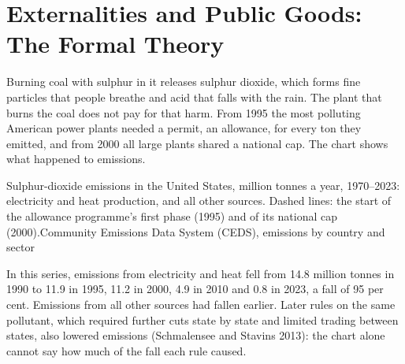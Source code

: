 \chapter{Externalities and Public Goods: The Formal Theory}\label{ch:b2:externalities-and-public-goods-theory}

Burning coal with sulphur in it releases sulphur dioxide, which forms fine particles that people breathe and acid that
falls with the rain. The plant that burns the coal does not pay for that harm. From 1995 the most polluting American power plants needed a
permit, an allowance, for every ton they emitted, and from 2000 all large plants shared a national cap. The chart
shows what happened to emissions.

\begin{openingchart}{Sulphur-dioxide emissions in the United States, million tonnes a year, 1970--2023: electricity and heat
  production, and all other sources. Dashed lines: the start of the allowance programme's first phase (1995) and of
  its national cap (2000).}{Community Emissions Data System (CEDS), emissions by country and sector}
\end{openingchart}

In this series, emissions from electricity and heat fell from 14.8 million tonnes in 1990 to 11.9 in 1995, 11.2 in 2000,
4.9 in 2010 and 0.8 in 2023, a fall of 95 per cent. Emissions from all other sources had fallen earlier. Later rules on the
same pollutant, which required further cuts state by state and limited trading between states, also lowered emissions
(Schmalensee and Stavins 2013): the chart alone cannot say how much of the fall each rule caused.

